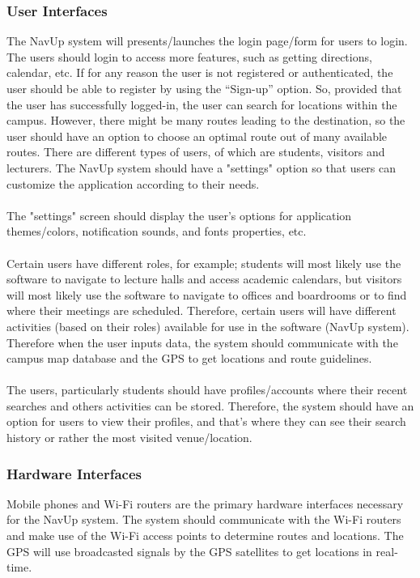 \documentclass{article}
\begin{document}
	\subsubsection{User Interfaces}
The NavUp system will presents/launches the login page/form for users to login. The users should login to access more features, 
such as getting directions, calendar, etc. If for any reason the user is not registered or authenticated, the user should be able to 
register by using the “Sign-up” option. So, provided that the user has successfully logged-in, the user can search for locations within 
the campus. However, there might be many routes leading to the destination, so the user should have an option to choose an optimal 
route out of many available routes. There are different types of users, of which are students, visitors and lecturers.\newline
The NavUp system should have a "settings" option so that users can customize the application according to their needs.\\\\
The "settings" screen should display the user's options for application themes/colors, notification sounds, and fonts properties, etc.\\\\
Certain users have different roles, for example; students will most likely use the software to navigate to lecture halls and access academic calendars, 
but visitors will most likely use the software to navigate to offices and boardrooms or to find where their meetings are scheduled. 
Therefore, certain users will have different activities (based on their roles) available for use in the software (NavUp system).
 Therefore when the user inputs data, the system should communicate with the campus map database and the GPS to get locations and route guidelines.\\\\
The users, particularly students should have profiles/accounts where their recent searches and others activities can be stored. 
Therefore, the system should have an option for users to view their profiles, and that’s where they can see their search history or rather the most visited venue/location. \\

	\subsubsection{Hardware Interfaces}
Mobile phones and Wi-Fi routers are the primary hardware interfaces necessary for the NavUp system. The system should communicate
 with the Wi-Fi routers and make use of the Wi-Fi access points to determine routes and locations. The GPS will use broadcasted signals by 
the GPS satellites to get locations in real-time. \\
\end{document}
